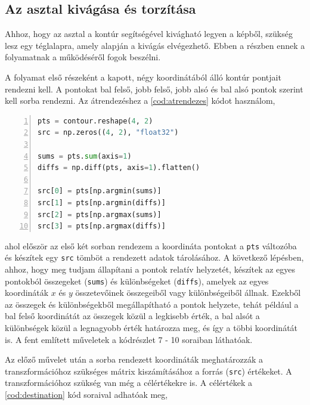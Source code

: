 \subsection{Az asztal kivágása és torzítása}
Ahhoz, hogy az asztal a kontúr segítségével kivágható legyen a képből, szükség lesz egy téglalapra, amely alapján a kivágás elvégezhető. Ebben a részben ennek a folyamatnak a működéséről fogok beszélni.
\par A folyamat első részeként a kapott, négy koordinátából álló kontúr pontjait rendezni kell. A pontokat bal felső, jobb felső, jobb alsó és bal alsó pontok szerint kell sorba rendezni.
\newline Az átrendezéshez a \ref{cod:atrendezes} kódot használom,

\vspace{2mm}
\hspace{-10mm}
\begin{minipage}{\linewidth}
\begin{lstlisting}[language=Python, numbers=left, caption={Átrendező algoritmus.}, label={cod:atrendezes}]
pts = contour.reshape(4, 2)
src = np.zeros((4, 2), "float32")

sums = pts.sum(axis=1)
diffs = np.diff(pts, axis=1).flatten()

src[0] = pts[np.argmin(sums)]
src[1] = pts[np.argmin(diffs)]
src[2] = pts[np.argmax(sums)]
src[3] = pts[np.argmax(diffs)]
\end{lstlisting}
\end{minipage}

\par ahol először az első két sorban rendezem a koordináta pontokat a \lstinline{pts} változóba és készítek egy \lstinline{src} tömböt a rendezett adatok tárolásához. A következő lépésben, ahhoz, hogy meg tudjam állapítani a pontok relatív helyzetét, készítek az egyes pontokból összegeket (\lstinline{sums}) és különbségeket (\lstinline{diffs}), amelyek az egyes koordináták $x$ és $y$ összetevőinek összegeiből vagy különbségeiből állnak. Ezekből az összegek és különbségekből megállapítható a pontok helyzete, tehát például a bal felső koordinátát az összegek közül a legkisebb érték, a bal alsót a különbségek közül a legnagyobb érték határozza meg, és így a többi koordinátát is. A fent említett műveletek a kódrészlet 7 - 10 soraiban láthatóak.
\par Az előző művelet után a sorba rendezett koordináták meghatározzák a transzformációhoz szükséges mátrix kiszámításához a forrás (\lstinline{src}) értékeket. A transzformációhoz szükség van még a célértékekre is.
\newline A célértékek a \ref{cod:destination} kód soraival adhatóak meg,

